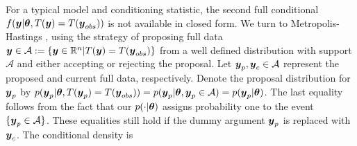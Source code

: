 \documentclass[12pt]{article}
\def\bth{\mbox{\boldmath $\theta$}}
\def\bbeta{\mbox{\boldmath $\beta$}}
\newcommand{\by}{\mbox{\boldmath $y$}}
\newcommand{\mc}{\mathcal}
\newcommand{\blue}[1]{{\color{blue}#1}}
\begin{document}
For a typical model and conditioning statistic, the second full conditional $f(\by|\bth, T(\by)=T(\by_{obs}))$ %
is not available in closed form.  We turn to Metropolis-Hastings \citep{hastings1970},
using the strategy of proposing full data $\by \in \mathcal{A}:=\{\by \in \mathbb{R}^n | T(\by)=T(\by_{obs})\}$ from a well defined distribution with support $\mathcal{A}$ and either accepting or rejecting the
proposal. Let $\by_p, \by_c \in \mathcal{A}$ represent the proposed and current
full data, respectively. Denote the proposal distribution for $\by_{p}$ by $p(\by_p|\bth,T(\by_p) = T(\by_{obs})) = p(\by_p|\bth,\by_p \in \mathcal{A}) = p(\by_p | \bth)$.  The last equality follows from the fact that our $p(\cdot | \bth)$ assigns probability one to the event $\{ \by_p \in \mathcal{A} \}$.  These equalities still hold if the dummy argument $\by_p$ is replaced with $\by_c$.  The conditional density is
\end{document}
